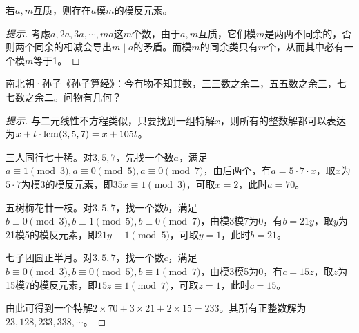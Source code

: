 \begin{theorem}[模反的存在性]
  若$a,m$互质，则存在$a$模$m$的模反元素。
\end{theorem}
\begin{proof}[提示]
  考虑$a,2a,3a,\cdots,ma$这$m$个数，由于$a,m$互质，它们模$m$是两两不同余的，否则两个同余的相减会导出$m\mid a$的矛盾。而模$m$的同余类只有$m$个，从而其中必有一个模$m$等于1。
\end{proof}

\begin{example}
  南北朝·孙子《孙子算经》：今有物不知其数，三三数之余二，五五数之余三，七七数之余二。问物有几何？
\end{example}
\begin{proof}[提示]
  与二元线性不方程类似，只要找到一组特解$x$，则所有的整数解都可以表达为$x+t\cdot\mathrm{lcm}(3,5,7)=x+105t$。

  三人同行七十稀。对$3,5,7$，先找一个数$a$，满足$a\equiv 1\pmod3, a\equiv0\pmod5, a\equiv0\pmod7$，由后两个，有$a=5\cdot7\cdot x$，取$x$为$5\cdot 7$为模$3$的模反元素，即$35x\equiv1\pmod3$，可取$x=2$，此时$a=70$。

  五树梅花廿一枝。对$3,5,7$，找一个数$b$，满足$b\equiv0\pmod3, b\equiv1\pmod5,b\equiv0\pmod7$，由模3模7为0，有$b=21y$，取$y$为21模5的模反元素，即$21y\equiv1\pmod5$，可取$y=1$，此时$b=21$。

  七子团圆正半月。对$3,5,7$，找一个数$c$，满足$b\equiv0\pmod3, b\equiv0\pmod5,b\equiv1\pmod7$，由模3模5为0，有$c=15z$，取$z$为15模7的模反元素，即$15z\equiv1\pmod7$，可取$z=1$，此时$c=15$。

  由此可得到一个特解$2\times 70+3\times 21+2\times 15=233$。其所有正整数解为$23,128,233,338,\cdots$。
\end{proof}

